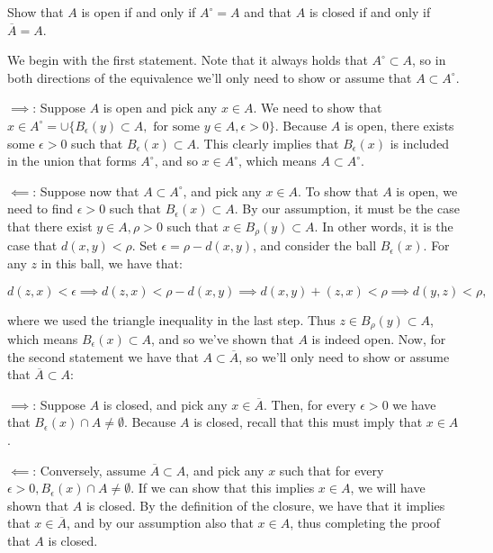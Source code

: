 \begin{exercise}{17}
    Show that $A$ is open if and only if $A^{\circ} = A$ and that $A$ is closed if and only if $\overline{A} = A$.
\end{exercise}

\begin{solution}
    
    We begin with the first statement.
    Note that it always holds that $A^{\circ} \subset A$, so in both directions of the equivalence we'll only need to show or assume that $A \subset A^{\circ}$.
    
    $\implies$: Suppose $A$ is open and pick any $x \in A$.
    We need to show that $x \in A^{\circ} = \cup \{B_{\epsilon}(y) \subset A, \text{ for some } y \in A, \epsilon > 0\}$.
    Because $A$ is open, there exists some $\epsilon > 0$ such that $B_{\epsilon}(x) \subset A$.
    This clearly implies that $B_{\epsilon}(x)$ is included in the union that forms $A^{\circ}$, and so $x \in A^{\circ}$, which means $A \subset A^{\circ}$.

    $\impliedby$: Suppose now that $A \subset A^{\circ}$, and pick any $x \in A$.
    To show that $A$ is open, we need to find $\epsilon > 0$ such that $B_{\epsilon}(x) \subset A$.
    By our assumption, it must be the case that there exist $y \in A, \rho > 0$ such that $x \in B_{\rho}(y) \subset A$.
    In other words, it is the case that $d(x, y) < \rho$.
    Set $\epsilon = \rho - d(x, y)$, and consider the ball $B_{\epsilon}(x)$.
    For any $z$ in this ball, we have that:

    $$d(z, x) < \epsilon \implies d(z, x) < \rho - d(x, y) \implies d(x, y) + (z, x) < \rho \implies d(y, z) < \rho,$$

    where we used the triangle inequality in the last step.
    Thus $z \in B_{\rho}(y) \subset A$, which means $B_{\epsilon}(x) \subset A$, and so we've shown that $A$ is indeed open.
    Now, for the second statement we have that $A \subset \overline{A}$, so we'll only need to show or assume that $\overline{A} \subset A$:

    $\implies$: Suppose $A$ is closed, and pick any $x \in \overline{A}$.
    Then, for every $\epsilon > 0$ we have that $B_{\epsilon}(x) \cap A \neq \emptyset$.
    Because $A$ is closed, recall that this must imply that $x \in A$.

    $\impliedby$: Conversely, assume $\overline{A} \subset A$, and pick any $x$ such that for every $\epsilon > 0, B_{\epsilon}(x) \cap A \neq \emptyset$.
    If we can show that this implies $x \in A$, we will have shown that $A$ is closed.
    By the definition of the closure, we have that it implies that $x \in \overline{A}$, and by our assumption also that $x \in A$, thus completing the proof that $A$ is closed.

\end{solution}

